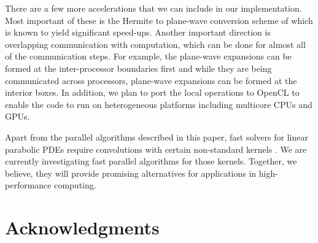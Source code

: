 \documentclass[conference]{IEEEtran}
\begin{document}
There are a few more accelerations that we can include in our implementation. Most important of these is the Hermite to 
plane-wave conversion scheme of \cite{fggt} which is known to yield significant speed-ups. Another important direction
 is overlapping communication with computation, which can be done for almost all of the communication steps. For example, 
 the plane-wave expansions can be formed at the inter-processor boundaries first and while they are being communicated 
 across processors, plane-wave expansions can be formed at the interior boxes. In addition, we plan to port the local operations to OpenCL \cite{opencl} to enable the code to run on heterogeneous platforms including multicore CPUs and GPUs.

Apart from the parallel algorithms described in this paper, fast solvers for linear parabolic PDEs 
require convolutions with certain non-standard kernels \cite{li09, skv09}. We are currently investigating fast 
parallel algorithms for those kernels. Together, we believe, they will provide promising alternatives 
for applications in high-performance computing. 

\section*{Acknowledgments}




\end{document}
